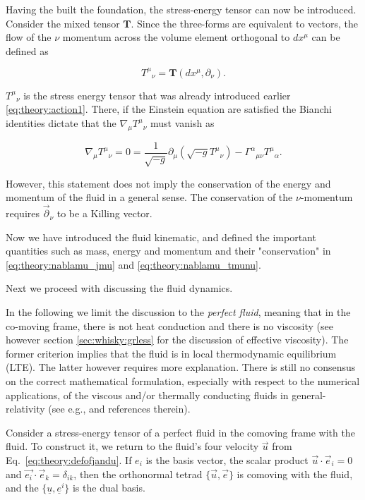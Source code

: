 \documentclass[11pt,a4paper,headinclude=true,DIV=14,BCOR=8mm,chapterprefix,listof=totoc,twoside,openright,abstracton]{scrbook}
\begin{document}
Having the built the foundation, the stress-energy tensor can now be introduced.
Consider the mixed tensor $\boldsymbol{T}$. Since the three-forms are equivalent to vectors, the flow of the $\nu$ momentum across the volume element orthogonal to $dx^{\mu}$ can be defined as

\begin{equation}
    {T^{\mu}}_{\nu}=\boldsymbol{T}(dx^{\mu},\partial_{\nu}).
\end{equation}

${T^{\mu}}_{\nu}$ is the stress energy tensor that was already introduced earlier \eqref{eq:theory:action1}. There, if the Einstein equation are satisfied the Bianchi identities dictate that the $\nabla_{\mu}{T^{\mu}}_{\nu}$ must vanish as

\begin{equation}
    \nabla_{\mu}{T^{\mu}}_{\nu} = 0= \frac{1}{\sqrt{-g}}\partial_{\mu}(\sqrt{-g}{T^{\mu}}_{\nu}) - {\Gamma^{\alpha}}_{\mu\nu}{T^{\mu}}_{\alpha}.
    \label{eq:theory:nablamu_tmunu}
\end{equation}

However, this statement does not imply the conservation of the energy and momentum of the fluid in a general sense. The conservation of the $\nu$-momentum requires $\vec{\partial}_{\nu}$ to be a Killing vector.




Now we have introduced the fluid kinematic, and defined the important quantities such as mass, energy and momentum and their "conservation" in \eqref{eq:theory:nablamu_jmu} and \eqref{eq:theory:nablamu_tmunu}.

Next we proceed with discussing the fluid dynamics. 

In the following we limit the discussion to the \textit{perfect fluid}, meaning that in the co-moving frame, there is not heat conduction and there is no viscosity (see however section \ref{sec:whisky:grless} for the discussion of effective viscosity). The former criterion implies that the fluid is in local thermodynamic equilibrium (LTE). The latter however requires more explanation. There is still no consensus on the correct mathematical formulation, especially with respect to the numerical applications, of the viscous and/or thermally conducting fluids in general-relativity (see e.g., \cite{Andersson:2006nr} and references therein). 

Consider a stress-energy tensor of a perfect fluid in the comoving frame with the fluid. To construct it, we return to the fluid's four velocity $\vec{u}$ from Eq.~\eqref{eq:theory:defofjandu}. If $e_{i}$ is the basis vector, the scalar product $\vec{u}\cdot\vec{e}_i=0$ and $\vec{e_i}\cdot\vec{e}_k = \delta_{ik}$, then the orthonormal tetrad $\{\vec{u},\vec{e}\}$ is comoving with the fluid, and the $\{\underline{u},\underline{e}^i\}$ is the dual basis. 
\end{document}
